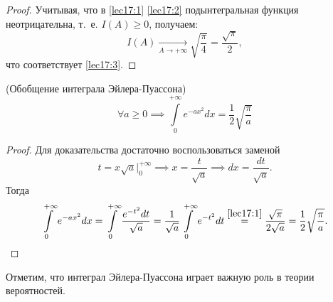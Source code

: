 \documentclass[../../main.tex]{subfiles}
\begin{document}
\begin{proof}
    Учитывая, что в \eqref{lec17:1} \eqref{lec17:2} 
    подынтегральная функция неотрицательна, т.~е.
    $I(A) \geq 0$, получаем:
    \[
     I(A)\xrightarrow[A\to +\infty]{} 
     \sqrt{\frac{\pi}{4}} = \frac{\sqrt{\pi}}{2},
	\]
	что соответствует \eqref{lec17:3}.
\end{proof}

\begin{crl*}
 (Обобщение интеграла Эйлера-Пуассона)
    \begin{equation}
		 	\label{lec17:9}
		 	\forall a \geq 0 \implies \int\limits_0^{+\infty}e^{-ax^2}dx = 
		 	\frac{1}{2}\sqrt{\frac{\pi}{a}}
    \end{equation}
\end{crl*}
\begin{proof}
 Для доказательства достаточно воспользоваться заменой
 \begin{equation*}
  t = x\sqrt{a}\Big|_0^{+\infty} \implies x = \frac{t}{\sqrt{a}} 
  \implies dx = \frac{dt}{\sqrt{a}}.
 \end{equation*}
  Тогда
\begin{equation*}
    \int\limits_0^{+\infty}e^{-ax^2}dx = 
    \int\limits_{0}^{+\infty}\frac{e^{-t^2}dt}{\sqrt{a}} = 
    \frac{1}{\sqrt{a}} \int\limits_{0}^{+\infty}e^{-t^2}dt 
    \overset{\eqref{lec17:1}}=
    \frac{\sqrt{\pi}}{2\sqrt{a}} =
    \frac{1}{2}\sqrt{\frac{\pi}{a}}.
    \qedhere
\end{equation*}
\end{proof}
Отметим, что интеграл Эйлера-Пуассона играет 
важную роль в теории вероятностей.
\end{document}

